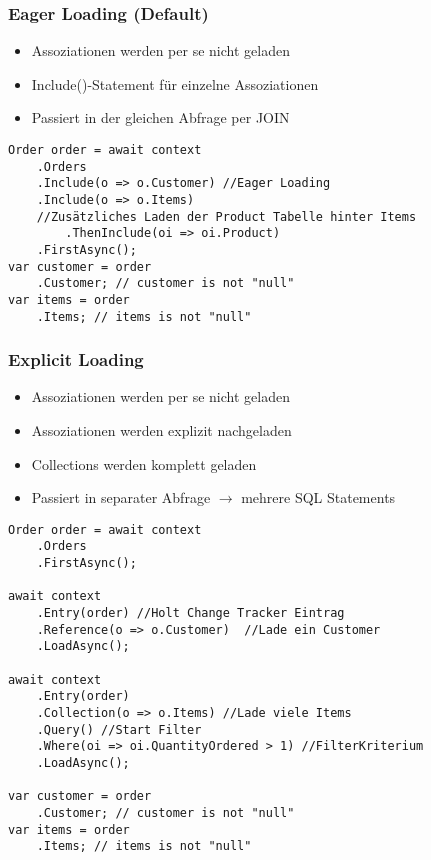 \begin{multicols*}{2}
\subsubsection{Eager Loading (Default)}
\begin{itemize}
    \item Assoziationen werden per se nicht geladen
    \item Include()-Statement für einzelne Assoziationen
    \item Passiert in der gleichen Abfrage per JOIN
\end{itemize}
\begin{lstlisting}
Order order = await context 
    .Orders
    .Include(o => o.Customer) //Eager Loading
    .Include(o => o.Items)
    //Zusätzliches Laden der Product Tabelle hinter Items
        .ThenInclude(oi => oi.Product)
    .FirstAsync();
var customer = order
    .Customer; // customer is not "null"
var items = order
    .Items; // items is not "null"
\end{lstlisting}
\subsubsection{Explicit Loading}
\begin{itemize}
    \item Assoziationen werden per se nicht geladen
    \item Assoziationen werden explizit nachgeladen
    \item Collections werden komplett geladen
    \item Passiert in separater Abfrage $\rightarrow$ mehrere SQL Statements   
\end{itemize}
\begin{lstlisting}
Order order = await context 
    .Orders
    .FirstAsync();

await context
    .Entry(order) //Holt Change Tracker Eintrag
    .Reference(o => o.Customer)  //Lade ein Customer
    .LoadAsync();

await context
    .Entry(order)
    .Collection(o => o.Items) //Lade viele Items
    .Query() //Start Filter
    .Where(oi => oi.QuantityOrdered > 1) //FilterKriterium
    .LoadAsync();

var customer = order
    .Customer; // customer is not "null"
var items = order
    .Items; // items is not "null"
\end{lstlisting}

\end{multicols*}
